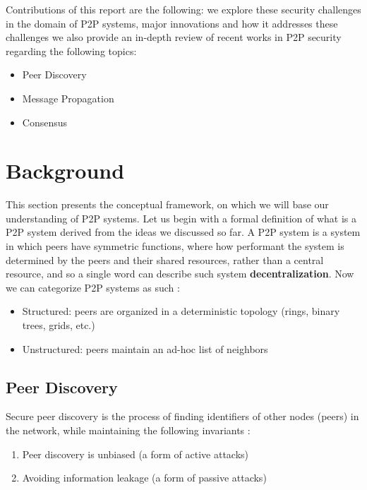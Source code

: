 \documentclass[12pt,twocolumn]{article}
\begin{document}
Contributions of this report are the following: we explore these security challenges 
in the domain of P2P systems, major innovations and how it addresses these challenges 
we also provide an in-depth review of recent works in P2P security regarding 
the following topics:
\begin{itemize}
    \item Peer Discovery 
    \item Message Propagation
    \item Consensus
\end{itemize}

\section{Background}
This section presents the conceptual framework, on which we will base our understanding
of P2P systems. Let us begin with a formal definition of what is a P2P system derived from
the ideas we discussed so far. A P2P system is a system in which peers have symmetric functions,
where how performant the system is determined by the peers and their shared resources, rather than
a central resource, and so a single word can describe such system \textbf{decentralization}. 
Now we can categorize P2P systems as such \cite{ds:book}:
\begin{itemize}
    \item Structured: peers are organized in a deterministic topology (rings, binary trees, grids, etc.)
    \item Unstructured: peers maintain an ad-hoc list of neighbors
\end{itemize}

\subsection{Peer Discovery}
Secure peer discovery is the process of finding identifiers of other nodes (peers) in the network, 
while maintaining the following invariants \cite{guarded_gossip}:
\begin{enumerate}
    \item Peer discovery is unbiased (a form of active attacks)
    \item Avoiding information leakage (a form of passive attacks)
\end{enumerate}
\end{document}
